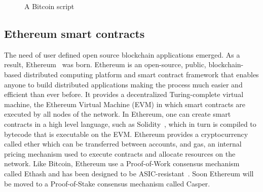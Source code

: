 \begin{figure}[!ht]
  \centering
  \caption{A Bitcoin script}
  \label{fig:bl_tx:script}
\end{figure}

\subsection{Ethereum smart contracts}
\label{smart_contracts:ethereum}

The need of user defined open source blockchain applications emerged. As a result, Ethereum~\cite{ethereum_yellowpaper, ethereum_whitepaper} was born. Ethereum is an open-source, public, blockchain-based distributed computing platform and smart contract framework that enables anyone to build distributed applications making the process much easier and efficient than ever before. It provides a decentralized Turing-complete virtual machine, the Ethereum Virtual Machine (EVM) in which smart contracts are executed by all nodes of the network. In Ethereum, one can create smart contracts in a high level language, such as Solidity~\cite{solidity}, which in turn is compiled to bytecode that is executable on the EVM. Ethereum provides a cryptocurrency called ether which can be transferred between accounts, and gas, an internal pricing mechanism used to execute contracts and allocate resources on the network. Like Bitcoin, Ethereum use a Proof-of-Work consensus mechanism called Ethash and has been designed to be ASIC-resistant~\cite{ethash}. Soon Ethereum will be moved to a Proof-of-Stake consensus mechanism called Casper.

